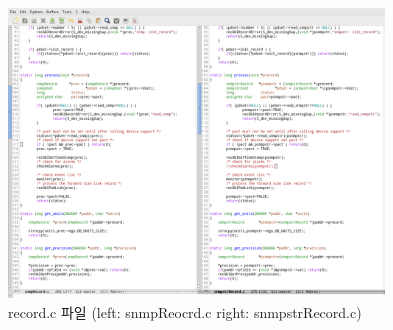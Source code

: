 \documentclass[11pt
  , a4paper
  , article
  , oneside
]{memoir}
\begin{document}
\begin{figure}[h!]
  \centering
  \includegraphics[width=0.89\textwidth]{./images/recordc.eps}
  \caption{record.c 파일 (left: snmpReocrd.c right: snmpstrRecord.c)}
  \label{fig:recordc}   
\end{figure}
\end{document}
